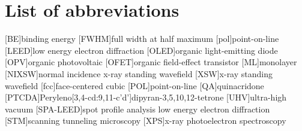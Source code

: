 \newpage
\section*{List of abbreviations}

\begin{acronym}
    [BE]{binding energy}
    [FWHM]{full width at half maximum}
    [pol]{point-on-line}
    [LEED]{low energy electron diffraction}
    [OLED]{organic light-emitting diode}
    [OPV]{organic photovoltaic}
    [OFET]{organic field-effect transistor}
    [ML]{monolayer}
    [NIXSW]{normal incidence x-ray standing wavefield}
    [XSW]{x-ray standing wavefield}
    [fcc]{face-centered cubic}
    [POL]{point-on-line}
    [QA]{quinacridone}
    [PTCDA]{Peryleno[3,4-cd:9,11-c'd']dipyran-3,5,10,12-tetrone}
    [UHV]{ultra-high vacuum}
    [SPA-LEED]{spot profile analysis low energy electron diffraction}
    [STM]{scanning tunneling microscopy}
    [XPS]{x-ray photoelectron spectroscopy}
\end{acronym}




